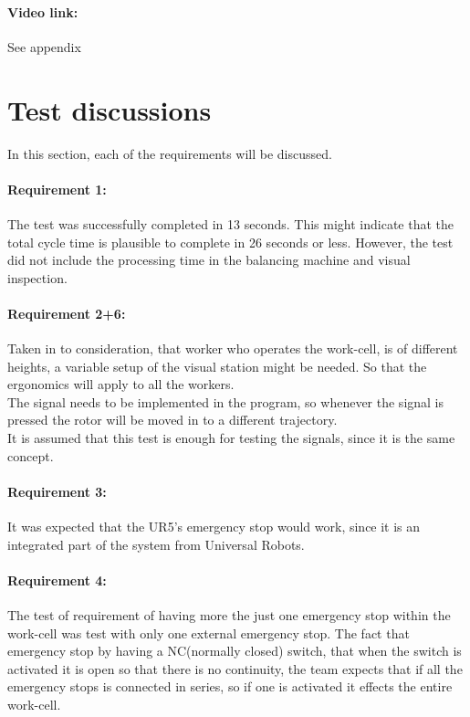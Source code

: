 \paragraph{Video link: }
See appendix \cite{testfilm}

\section{Test discussions}
In this section, each of the requirements will be discussed. 

\paragraph{Requirement 1:}
The test was successfully completed in 13 seconds. This might indicate that the total cycle time is plausible to complete in 26 seconds or less. However, the test did not include the processing time in the balancing machine and visual inspection. 

\paragraph{Requirement 2+6:}
Taken in to consideration, that worker who operates the work-cell, is of different heights, a variable setup of the visual station might be needed. So that the ergonomics will apply to all the workers.\\
The signal needs to be implemented in the program, so whenever the signal is pressed the rotor will be moved in to a different trajectory.\\
It is assumed that this test is enough for testing the signals, since it is the same concept.

\paragraph{Requirement 3:}
It was expected that the UR5's emergency stop would work, since it is an integrated part of the system from Universal Robots. 

\paragraph{Requirement 4:}

The test of requirement of having more the just one emergency stop within the work-cell was test with only one external emergency stop. The fact that emergency stop by having a NC(normally closed) switch, that when the switch is activated it is open so that there is no continuity, the team expects that if all the emergency stops is connected in series, so if one is activated it effects the entire work-cell.  

